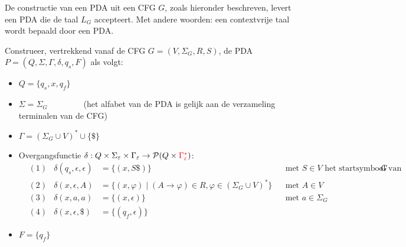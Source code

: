 \documentclass[../aanvullingen_cursus.tex]{subfiles}
\begin{document}
\begin{stelling}
	De constructie van een PDA uit een CFG \(G\), zoals hieronder beschreven, levert een PDA die de taal \(L_G\) accepteert. Met andere woorden: een contextvrije taal wordt bepaald door een PDA.

	\hfill

	Construeer, vertrekkend vanaf de CFG \(G=(V,\Sigma_G,R,S)\), de PDA \(P=(Q,\Sigma,\Gamma,\delta,q_s,F)\) als volgt:
	\begin{itemize}
		\item \(Q=\{q_s,x,q_f\}\)
		\item \(\Sigma = \Sigma_G \qquad \qquad\) \scriptsize(het alfabet van de PDA is gelijk aan de verzameling terminalen van de CFG) \normalsize
		\item \(\Gamma = (\Sigma_G \cup V)^* \cup \{\$\}\)
		\item Overgangsfunctie \(\delta:Q\times \Sigma_\epsilon \times \Gamma_\epsilon \to \powerset[Q\times\color{red}\Gamma_\epsilon^*\color{black}]\):
		\begin{align*}
			&(1) & \delta(q_s,\epsilon,\epsilon) &=\{(x,S\$)\} && \text{met \(S\in V\) het startsymbool van }G \\
			&(2) & \delta(x,\epsilon, A) &= \{(x,\varphi) \mid (A\rightarrow\varphi) \in R, \varphi \in (\Sigma_G \cup V)^*\} && \text{met } A \in V \\
			&(3) & \delta(x,a,a) &= \{(x,\epsilon)\} && \text{met } a \in \Sigma_G \\
			&(4) & \delta(x,\epsilon,\$) &= \{(q_f,\epsilon)\}
		\end{align*}
		\item \(F=\{q_f\}\)
	\end{itemize}
\end{stelling}
\end{document}
